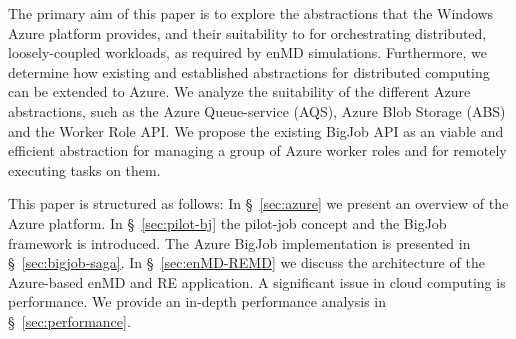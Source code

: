 \documentclass[conference,final]{IEEEtran}
\newcommand{\up}{\vspace*{-1em}}
\newcommand{\alnote}[1]{ {\textcolor{blue} { ***AL: #1 }}}
\newcommand{\jhanote}[1]{ {\textcolor{red} { ***SJ: #1 }}}
\newcommand{\alnote}[1]{}
\newcommand{\jhanote}[1]{}
\begin{document}
The primary aim of this paper is to explore the abstractions that the
Windows Azure platform provides, and their suitability to for
orchestrating distributed, loosely-coupled workloads, as required by
enMD simulations. Furthermore, we determine how existing and
established abstractions for distributed computing can be extended to
Azure.  We analyze the suitability of the different Azure
abstractions, such as the Azure Queue-service (AQS), Azure Blob
Storage (ABS) and the Worker Role API.%
We propose the existing BigJob API as an viable and efficient
abstraction for managing a group of Azure worker roles and for
remotely executing tasks on them.






This paper is structured as follows: In \S~\ref{sec:azure} we present
an overview of the Azure platform. In \S~\ref{sec:pilot-bj} the pilot-job 
concept and the BigJob framework is introduced. The Azure BigJob 
implementation is presented in \S~\ref{sec:bigjob-saga}.
In \S~\ref{sec:enMD-REMD} we discuss the
architecture of the Azure-based enMD and RE application.  A
significant issue in cloud computing is performance. We provide an
in-depth performance analysis in \S~\ref{sec:performance}.

\up
\end{document}
